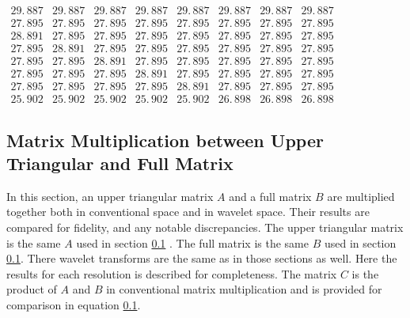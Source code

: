 \documentclass{article}
\begin{document}
$
\begin{array}{cccccccc}
29.\,\allowbreak 887 & 29.\,\allowbreak 887 & 29.\,\allowbreak 887 & 
29.\,\allowbreak 887 & 29.\,\allowbreak 887 & 29.\,\allowbreak 887 & 
29.\,\allowbreak 887 & 29.\,\allowbreak 887 \\ 
27.\,\allowbreak 895 & 27.\,\allowbreak 895 & 27.\,\allowbreak 895 & 
27.\,\allowbreak 895 & 27.\,\allowbreak 895 & 27.\,\allowbreak 895 & 
27.\,\allowbreak 895 & 27.\,\allowbreak 895 \\ 
28.\,\allowbreak 891 & 27.\,\allowbreak 895 & 27.\,\allowbreak 895 & 
27.\,\allowbreak 895 & 27.\,\allowbreak 895 & 27.\,\allowbreak 895 & 
27.\,\allowbreak 895 & 27.\,\allowbreak 895 \\ 
27.\,\allowbreak 895 & 28.\,\allowbreak 891 & 27.\,\allowbreak 895 & 
27.\,\allowbreak 895 & 27.\,\allowbreak 895 & 27.\,\allowbreak 895 & 
27.\,\allowbreak 895 & 27.\,\allowbreak 895 \\ 
27.\,\allowbreak 895 & 27.\,\allowbreak 895 & 28.\,\allowbreak 891 & 
27.\,\allowbreak 895 & 27.\,\allowbreak 895 & 27.\,\allowbreak 895 & 
27.\,\allowbreak 895 & 27.\,\allowbreak 895 \\ 
27.\,\allowbreak 895 & 27.\,\allowbreak 895 & 27.\,\allowbreak 895 & 
28.\,\allowbreak 891 & 27.\,\allowbreak 895 & 27.\,\allowbreak 895 & 
27.\,\allowbreak 895 & 27.\,\allowbreak 895 \\ 
27.\,\allowbreak 895 & 27.\,\allowbreak 895 & 27.\,\allowbreak 895 & 
27.\,\allowbreak 895 & 28.\,\allowbreak 891 & 27.\,\allowbreak 895 & 
27.\,\allowbreak 895 & 27.\,\allowbreak 895 \\ 
25.\,\allowbreak 902 & 25.\,\allowbreak 902 & 25.\,\allowbreak 902 & 
25.\,\allowbreak 902 & 25.\,\allowbreak 902 & 26.\,\allowbreak 898 & 
26.\,\allowbreak 898 & 26.\,\allowbreak 898
\end{array}
\allowbreak $

\subsection {Matrix Multiplication between Upper Triangular and Full Matrix}
In this section,  an upper triangular matrix $A$ and a full matrix $B$ are multiplied together both in conventional space and in wavelet space.  Their results are compared for fidelity, and any notable discrepancies.  The upper triangular matrix is the same $A$ used in section \ref{} .  The full matrix is the same $B$ used in section \ref{}.  There wavelet transforms are the same as in those sections as well.  Here the results for each resolution is described for completeness.  The matrix $C$ is the product of $A$ and $B$ in conventional matrix multiplication and is provided for comparison in equation \ref{}.
\end{document}

